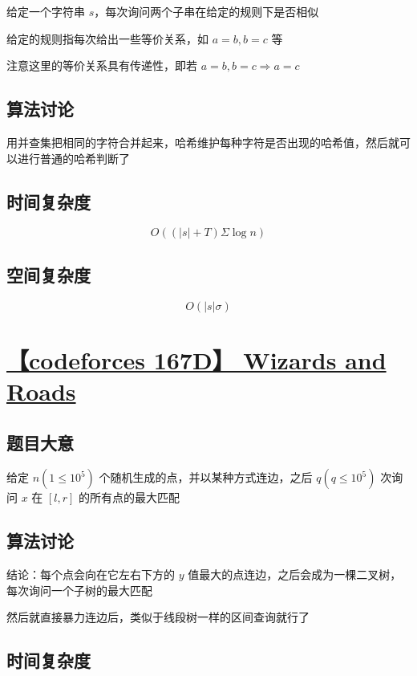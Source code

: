 \documentclass[UTF8]{article}
\begin{document}
给定一个字符串 $s$，每次询问两个子串在给定的规则下是否相似

给定的规则指每次给出一些等价关系，如 $a=b,b=c$ 等

注意这里的等价关系具有传递性，即若 $a=b,b=c \Rightarrow a=c$

\subsection{算法讨论}

用并查集把相同的字符合并起来，哈希维护每种字符是否出现的哈希值，然后就可以进行普通的哈希判断了

\subsection{时间复杂度}

$$
O((|s| + T) \Sigma \log n)
$$

\subsection{空间复杂度}

$$
O(|s| \sigma)
$$

\section{\href{https://codeforces.com/problemset/problem/167/D}{【codeforces 167D】 Wizards and Roads}}

\subsection{题目大意}

给定 $n(1 \le 10^5)$ 个随机生成的点，并以某种方式连边，之后 $q(q \le 10^5)$ 次询问 $x$ 在 $[l,r]$ 的所有点的最大匹配

\subsection{算法讨论}

结论：每个点会向在它左右下方的 $y$ 值最大的点连边，之后会成为一棵二叉树，每次询问一个子树的最大匹配

然后就直接暴力连边后，类似于线段树一样的区间查询就行了

\subsection{时间复杂度}
\end{document}
